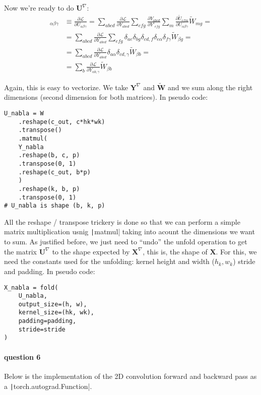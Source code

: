 \documentclass{article}
\begin{document}
\noindent Now we're ready to do \(\mathbf{U}^\nabla\):
\begin{align*}
    [\mathbf{U}^\nabla]_{\alpha\beta\gamma} &\equiv \frac{\partial \mathcal{L}}{\partial U_{\alpha\beta\gamma}} = \sum_{abcd}\frac{\partial \mathcal{L}}{\partial Y_{abcd}}\sum_{efg}\frac{\partial Y_{abcd}}{\partial Y'_{efg}}\sum_m \frac{\partial \tilde{U}_{efm}}{\partial U_{\alpha\beta\gamma}}\tilde{W}_{mg} = \\
    &= \sum_{abcd} \frac{\partial \mathcal{L}}{\partial Y_{abcd}}\sum_{efg}\delta_{ae}\delta_{bg}\delta_{cd, f}\delta_{e\alpha}\delta_{f\gamma}\tilde{W}_{\beta g} = \\
    &= \sum_{abcd} \frac{\partial \mathcal{L}}{\partial Y_{abcd}}\delta_{a\alpha}\delta_{cd, \gamma}\tilde{W}_{\beta b} = \\
    &= \sum_b \frac{\partial \mathcal{L}}{\partial Y_{\alpha b, \gamma}}\tilde{W}_{\beta b}
\end{align*}

\noindent Again, this is easy to vectorize. We take \(\mathbf{Y}^\nabla\) and \(\mathbf{\tilde{W}}\) and we sum along the right dimensions (second dimension for both matrices). In pseudo code:

\begin{verbatim}
U_nabla = W
    .reshape(c_out, c*hk*wk)
    .transpose()
    .matmul(
    Y_nabla
    .reshape(b, c, p)
    .transpose(0, 1)
    .reshape(c_out, b*p)
    )
    .reshape(k, b, p)
    .transpose(0, 1)
# U_nabla is shape (b, k, p)
\end{verbatim}

\noindent All the reshape / transpose trickery is done so that we can perform a simple matrix multiplication usnig \texttt|matmul| taking into acount the dimensions we want to sum. As justified before, we just need to ``undo'' the unfold operation to get the matrix \(\mathbf{U}^\nabla\) to the shape expected by \(\mathbf{X}^\nabla\), this is, the shape of \(\mathbf{X}\). For this, we need the constants used for the unfolding: kernel height and width (\(h_k, w_k\)) stride and padding. In pseudo code:

\begin{verbatim}
X_nabla = fold(
    U_nabla,
    output_size=(h, w),
    kernel_size=(hk, wk),
    padding=padding,
    stride=stride
)
\end{verbatim}

\paragraph{question 6} Below is the implementation of the 2D convolution forward and backward pass as a \texttt|torch.autograd.Function|.
\end{document}
